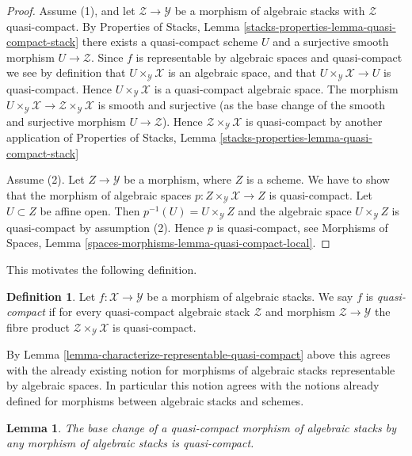 \documentclass{stacks-project}
\theoremstyle{plain}
\newtheorem{lemma}[subsection]{Lemma}
\theoremstyle{definition}
\newtheorem{definition}[subsection]{Definition}
\theoremstyle{remark}
\numberwithin{equation}{subsection}
\begin{document}
\begin{proof}
Assume (1), and let $\mathcal{Z} \to \mathcal{Y}$
be a morphism of algebraic stacks with $\mathcal{Z}$ quasi-compact. By
Properties of Stacks,
Lemma \ref{stacks-properties-lemma-quasi-compact-stack}
there exists a quasi-compact scheme $U$ and a surjective smooth
morphism $U \to \mathcal{Z}$. Since $f$ is representable by algebraic
spaces and quasi-compact we see by definition that
$U \times_\mathcal{Y} \mathcal{X}$ is an algebraic space, and that
$U \times_\mathcal{Y} \mathcal{X} \to U$ is quasi-compact.
Hence $U \times_\mathcal{Y} \mathcal{X}$ is a quasi-compact algebraic space.
The morphism
$U \times_\mathcal{Y} \mathcal{X} \to
\mathcal{Z} \times_\mathcal{Y} \mathcal{X}$
is smooth and surjective (as the base change of the smooth
and surjective morphism $U \to \mathcal{Z}$).
Hence $\mathcal{Z} \times_\mathcal{Y} \mathcal{X}$
is quasi-compact by another application of
Properties of Stacks,
Lemma \ref{stacks-properties-lemma-quasi-compact-stack}

\medskip\noindent
Assume (2). Let $Z \to \mathcal{Y}$ be a morphism, where $Z$ is a scheme.
We have to show that the morphism of algebraic spaces
$p : Z \times_\mathcal{Y} \mathcal{X} \to Z$ is quasi-compact.
Let $U \subset Z$ be affine open. Then
$p^{-1}(U) = U \times_\mathcal{Y} Z$
and the algebraic space $U \times_\mathcal{Y} Z$
is quasi-compact by assumption (2). Hence $p$ is quasi-compact, see
Morphisms of Spaces, Lemma \ref{spaces-morphisms-lemma-quasi-compact-local}.
\end{proof}

\noindent
This motivates the following definition.

\begin{definition}
\label{definition-quasi-compact}
Let $f : \mathcal{X} \to \mathcal{Y}$ be a morphism of algebraic stacks.
We say $f$ is {\it quasi-compact} if for every quasi-compact
algebraic stack $\mathcal{Z}$ and morphism $\mathcal{Z} \to \mathcal{Y}$
the fibre product $\mathcal{Z} \times_\mathcal{Y} \mathcal{X}$
is quasi-compact.
\end{definition}

\noindent
By
Lemma \ref{lemma-characterize-representable-quasi-compact}
above this agrees with the already existing notion
for morphisms of algebraic stacks representable by algebraic spaces.
In particular this notion agrees with the notions already defined
for morphisms between algebraic stacks and schemes.

\begin{lemma}
\label{lemma-base-change-quasi-compact}
The base change of a quasi-compact morphism of algebraic stacks
by any morphism of algebraic stacks is quasi-compact.
\end{lemma}
\end{document}
